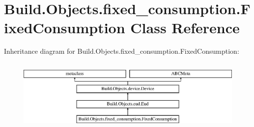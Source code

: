 \hypertarget{class_build_1_1_objects_1_1fixed__consumption_1_1_fixed_consumption}{}\section{Build.\+Objects.\+fixed\+\_\+consumption.\+Fixed\+Consumption Class Reference}
\label{class_build_1_1_objects_1_1fixed__consumption_1_1_fixed_consumption}
Inheritance diagram for Build.\+Objects.\+fixed\+\_\+consumption.\+Fixed\+Consumption\+:\begin{figure}[H]
\begin{center}
\leavevmode
\includegraphics[height=3.612903cm]{class_build_1_1_objects_1_1fixed__consumption_1_1_fixed_consumption}
\end{center}
\end{figure}
